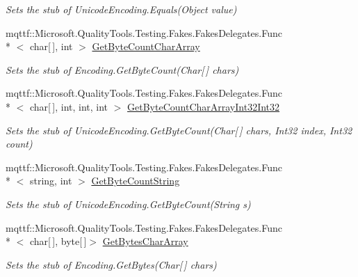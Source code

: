 \begin{DoxyCompactItemize}
\begin{DoxyCompactList}\small\item\em Sets the stub of Unicode\-Encoding.\-Equals(\-Object value)\end{DoxyCompactList}\item 
mqttf\-::\-Microsoft.\-Quality\-Tools.\-Testing.\-Fakes.\-Fakes\-Delegates.\-Func\\*
$<$ char\mbox{[}$\,$\mbox{]}, int $>$ \hyperlink{class_system_1_1_text_1_1_fakes_1_1_stub_unicode_encoding_a63b4c3c7e833b1d30402d7caa669ad05}{Get\-Byte\-Count\-Char\-Array}
\begin{DoxyCompactList}\small\item\em Sets the stub of Encoding.\-Get\-Byte\-Count(\-Char\mbox{[}$\,$\mbox{]} chars)\end{DoxyCompactList}\item 
mqttf\-::\-Microsoft.\-Quality\-Tools.\-Testing.\-Fakes.\-Fakes\-Delegates.\-Func\\*
$<$ char\mbox{[}$\,$\mbox{]}, int, int, int $>$ \hyperlink{class_system_1_1_text_1_1_fakes_1_1_stub_unicode_encoding_a797096fe1697a207b783da556fbc3005}{Get\-Byte\-Count\-Char\-Array\-Int32\-Int32}
\begin{DoxyCompactList}\small\item\em Sets the stub of Unicode\-Encoding.\-Get\-Byte\-Count(\-Char\mbox{[}$\,$\mbox{]} chars, Int32 index, Int32 count)\end{DoxyCompactList}\item 
mqttf\-::\-Microsoft.\-Quality\-Tools.\-Testing.\-Fakes.\-Fakes\-Delegates.\-Func\\*
$<$ string, int $>$ \hyperlink{class_system_1_1_text_1_1_fakes_1_1_stub_unicode_encoding_aecf08e996c9d88c7a9fb9e2e6b089e00}{Get\-Byte\-Count\-String}
\begin{DoxyCompactList}\small\item\em Sets the stub of Unicode\-Encoding.\-Get\-Byte\-Count(\-String s)\end{DoxyCompactList}\item 
mqttf\-::\-Microsoft.\-Quality\-Tools.\-Testing.\-Fakes.\-Fakes\-Delegates.\-Func\\*
$<$ char\mbox{[}$\,$\mbox{]}, byte\mbox{[}$\,$\mbox{]}$>$ \hyperlink{class_system_1_1_text_1_1_fakes_1_1_stub_unicode_encoding_a495e2d688e5169e61e559780b32fd046}{Get\-Bytes\-Char\-Array}
\begin{DoxyCompactList}\small\item\em Sets the stub of Encoding.\-Get\-Bytes(\-Char\mbox{[}$\,$\mbox{]} chars)\end{DoxyCompactList}\item 

\end{DoxyCompactItemize}
